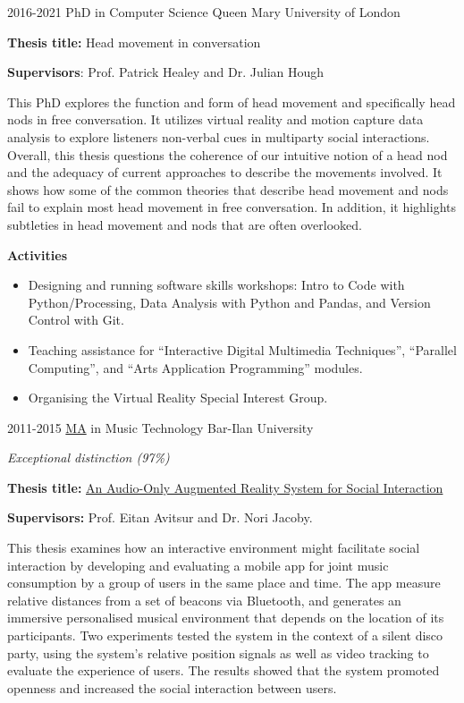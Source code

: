 \documentclass[]{friggeri-cv}
\begin{document}
\begin{entrylist}

  \entry
  {2016-2021}
  {PhD in Computer Science}
  {Queen Mary University of London}
  {
    \textbf{Thesis title:} Head movement in conversation

    \textbf{Supervisors}: Prof. Patrick Healey and Dr. Julian Hough

    This PhD explores the function and form of head movement and specifically head nods in free conversation.
    It utilizes virtual reality and motion capture data analysis to explore listeners non-verbal cues in multiparty social interactions.
    Overall, this thesis questions the coherence of our intuitive notion of a head nod and the adequacy of current approaches to describe the movements involved.
    It shows how some of the common theories that describe head movement and nods fail to explain most head movement in free conversation.
    In addition, it highlights subtleties in head movement and nods that are often overlooked.

    \textbf{Activities}
    \begin{itemize}
      \item
        Designing and running software skills workshops: Intro to Code with Python/Processing, Data Analysis with Python and Pandas, and Version Control with Git.
      \item
        Teaching assistance for ``Interactive Digital Multimedia Techniques'', ``Parallel Computing'', and ``Arts Application Programming'' modules.
      \item
        Organising the Virtual Reality Special Interest Group.
    \end{itemize}
  }

  \entry
  {2011-2015}
  {\href{http://www.tomgurion.me/pdfs/MA.pdf}{MA} in Music Technology}
  {Bar-Ilan University}
  {
    \textit{Exceptional distinction (97\%)}

    \textbf{Thesis title:} \href{http://www.tomgurion.me/pdfs/Gurion - An Audio-Only Augmented Reality System for Social Interaction.pdf}{An Audio-Only Augmented Reality System for Social Interaction}

    \textbf{Supervisors:} Prof. Eitan Avitsur and Dr. Nori Jacoby.

    This thesis examines how an interactive environment might facilitate social interaction by developing and evaluating a mobile app for joint music consumption by a group of users in the same place and time.
    The app measure relative distances from a set of beacons via Bluetooth, and generates an immersive personalised musical environment that depends on the location of its participants.
    Two experiments tested the system in the context of a silent disco party, using the system's relative position signals as well as video tracking to evaluate the experience of users.
    The results showed that the system promoted openness and increased the social interaction between users.

}
\end{entrylist}
\end{document}
